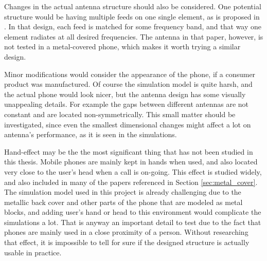 Changes in the actual antenna structure should also be considered. One potential structure would be having multiple feeds on one single element, as is proposed in \cite{valkonen_multifeed}. In that design, each feed is matched for some frequency band, and that way one element radiates at all desired frequencies. The antenna in that paper, however, is not tested in a metal-covered phone, which makes it worth trying a similar design.

Minor modifications would consider the appearance of the phone, if a consumer product was manufactured. Of course the simulation model is quite harsh, and the actual phone would look nicer, but the antenna design has some visually unappealing details. For example the gaps between different antennas are not constant and are located non-symmetrically. This small matter should be investigated, since even the smallest dimensional changes might affect a lot on antenna's performance, as it is seen in the simulations.

Hand-effect may be the the most significant thing that has not been studied in this thesis. Mobile phones are mainly kept in hands when used, and also located very close to the user's head when a call is on-going. This effect is studied widely, and also included in many of the papers referenced in Section \ref{sec:metal_cover}. The simulation model used in this project is already challenging due to the metallic back cover and other parts of the phone that are modeled as metal blocks, and adding user's hand or head to this environment would complicate the simulations a lot. That is anyway an important detail to test due to the fact that phones are mainly used in a close proximity of a person. Without researching that effect, it is impossible to tell for sure if the designed structure is actually usable in practice.


\clearpage